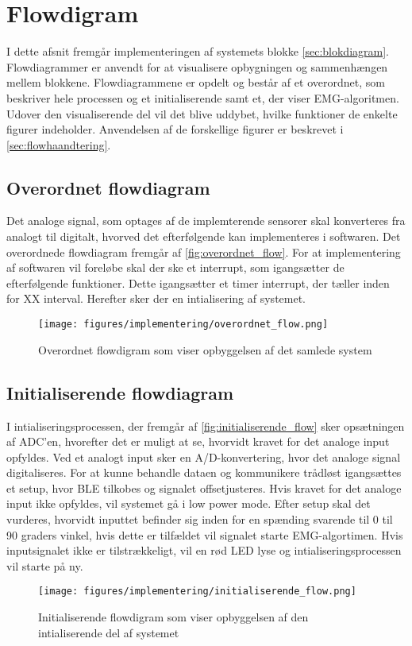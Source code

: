 \section{Flowdigram}
I dette afsnit fremgår implementeringen af systemets blokke \autoref{sec:blokdiagram}. Flowdiagrammer er anvendt for at visualisere opbygningen og sammenhængen mellem blokkene. Flowdiagrammene er opdelt og består af et overordnet, som beskriver hele processen og et initialiserende samt et, der viser EMG-algoritmen. Udover den visualiserende del vil det blive uddybet, hvilke funktioner de enkelte figurer indeholder. Anvendelsen af de forskellige figurer er beskrevet i \autoref{sec:flowhaandtering}.

\subsection{Overordnet flowdiagram}	
Det analoge signal, som optages af de implemterende sensorer skal konverteres fra analogt til digitalt, hvorved det efterfølgende kan implementeres i softwaren. Det overordnede flowdiagram fremgår af \autoref{fig:overordnet_flow}. For at implementering af softwaren vil foreløbe skal der ske et interrupt, som igangsætter de efterfølgende funktioner. Dette igangsætter et timer interrupt, der tæller inden for XX interval. Herefter sker der en intialisering af systemet.

\begin{figure}[H]
\centering
\texttt{[image: figures/implementering/overordnet\_flow.png]}
\caption{Overordnet flowdigram som viser opbyggelsen af det samlede system}
\label{fig:overordnet_flow}
\end{figure}


\subsection{Initialiserende flowdiagram}
I intialiseringsprocessen, der fremgår af \autoref{fig:initialiserende_flow} sker opsætningen af ADC'en, hvorefter det er muligt at se, hvorvidt kravet for det analoge input opfyldes. Ved et analogt input sker en A/D-konvertering, hvor det analoge signal digitaliseres. For at kunne behandle dataen og kommunikere trådløst igangsættes et setup, hvor BLE tilkobes og signalet offsetjusteres. Hvis kravet for det analoge input ikke opfyldes, vil systemet gå i low power mode. Efter setup skal det vurderes, hvorvidt inputtet befinder sig inden for en spænding svarende til 0 til 90 graders vinkel, hvis dette er tilfældet vil signalet starte EMG-algortimen. Hvis inputsignalet ikke er tilstrækkeligt, vil en rød LED lyse og intialiseringsprocessen vil starte på ny. 
\begin{figure}[H]
\centering
\texttt{[image: figures/implementering/initialiserende\_flow.png]}
\caption{Initialiserende flowdigram som viser opbyggelsen af den intialiserende del af systemet}
\label{fig:initialiserende_flow}
\end{figure}

